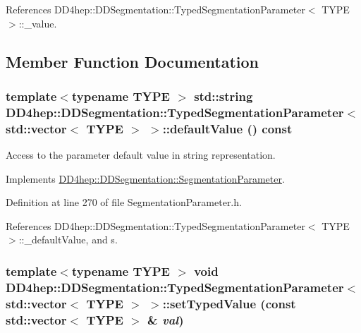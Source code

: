 References DD4hep::DDSegmentation::TypedSegmentationParameter$<$ TYPE $>$::\_\-value.

\subsection{Member Function Documentation}
\hypertarget{class_d_d4hep_1_1_d_d_segmentation_1_1_typed_segmentation_parameter_3_01std_1_1vector_3_01_t_y_p_e_01_4_01_4_a215047577378f5ffd7e92c5f19452cd2}{
\subsubsection[{defaultValue}]{\setlength{\rightskip}{0pt plus 5cm}template$<$typename TYPE $>$ std::string {\bf DD4hep::DDSegmentation::TypedSegmentationParameter}$<$ std::vector$<$ TYPE $>$ $>$::defaultValue () const}}
\label{class_d_d4hep_1_1_d_d_segmentation_1_1_typed_segmentation_parameter_3_01std_1_1vector_3_01_t_y_p_e_01_4_01_4_a215047577378f5ffd7e92c5f19452cd2}


Access to the parameter default value in string representation. 

Implements \hyperlink{class_d_d4hep_1_1_d_d_segmentation_1_1_segmentation_parameter_a2ef4dee84f8c9172aca49908c8fff136}{DD4hep::DDSegmentation::SegmentationParameter}.

Definition at line 270 of file SegmentationParameter.h.

References DD4hep::DDSegmentation::TypedSegmentationParameter$<$ TYPE $>$::\_\-defaultValue, and s.\hypertarget{class_d_d4hep_1_1_d_d_segmentation_1_1_typed_segmentation_parameter_3_01std_1_1vector_3_01_t_y_p_e_01_4_01_4_ab26ff43253babc240b2f92ff02b59d3b}{
\subsubsection[{setTypedValue}]{\setlength{\rightskip}{0pt plus 5cm}template$<$typename TYPE $>$ void {\bf DD4hep::DDSegmentation::TypedSegmentationParameter}$<$ std::vector$<$ TYPE $>$ $>$::setTypedValue (const std::vector$<$ TYPE $>$ \& {\em val})}}
\label{class_d_d4hep_1_1_d_d_segmentation_1_1_typed_segmentation_parameter_3_01std_1_1vector_3_01_t_y_p_e_01_4_01_4_ab26ff43253babc240b2f92ff02b59d3b}


